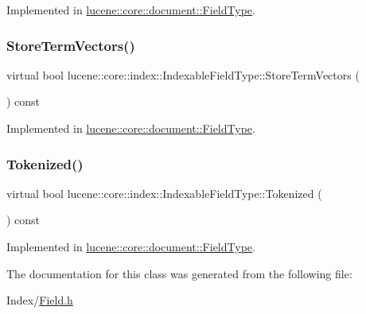 Implemented in \mbox{\hyperlink{classlucene_1_1core_1_1document_1_1FieldType_a72efd28a7f75bff7751e34edd7688c99}{lucene\+::core\+::document\+::\+Field\+Type}}.

\mbox{\label{classlucene_1_1core_1_1index_1_1IndexableFieldType_a21794361c1b7739d8cb8e11a39e23970}} 
\subsubsection{\texorpdfstring{Store\+Term\+Vectors()}{StoreTermVectors()}}
{\footnotesize\ttfamily virtual bool lucene\+::core\+::index\+::\+Indexable\+Field\+Type\+::\+Store\+Term\+Vectors (\begin{DoxyParamCaption}{ }\end{DoxyParamCaption}) const\hspace{0.3cm}{\ttfamily [pure virtual]}}



Implemented in \mbox{\hyperlink{classlucene_1_1core_1_1document_1_1FieldType_a435252ecad335aa118a4af5349342d0b}{lucene\+::core\+::document\+::\+Field\+Type}}.

\mbox{\label{classlucene_1_1core_1_1index_1_1IndexableFieldType_a107c742e5d273bbf4d1b36da7509c9ad}} 
\subsubsection{\texorpdfstring{Tokenized()}{Tokenized()}}
{\footnotesize\ttfamily virtual bool lucene\+::core\+::index\+::\+Indexable\+Field\+Type\+::\+Tokenized (\begin{DoxyParamCaption}{ }\end{DoxyParamCaption}) const\hspace{0.3cm}{\ttfamily [pure virtual]}}



Implemented in \mbox{\hyperlink{classlucene_1_1core_1_1document_1_1FieldType_ad46702a08ecdf7c0138bc950865f074c}{lucene\+::core\+::document\+::\+Field\+Type}}.



The documentation for this class was generated from the following file\+:\begin{DoxyCompactItemize}
\item 
Index/\mbox{\hyperlink{Index_2Field_8h}{Field.\+h}}\end{DoxyCompactItemize}
